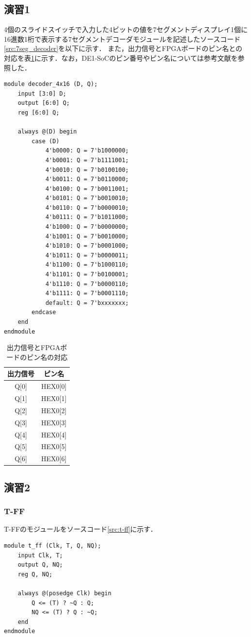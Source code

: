 \documentclass{jlreq}
\numberwithin{equation}{section}
\begin{document}
\subsection{演習1}
4個のスライドスイッチで入力した4ビットの値を7セグメントディスプレイ1個に16進数1桁で表示する7セグメントデコーダモジュールを記述したソースコード\ref{src:7seg_decoder}を以下に示す．
また，出力信号とFPGAボードのピン名との対応を表\ref{tab:decoder-pin}に示す．なお，DE1-SoCのピン番号やピン名については参考文献\cite{user_manual}を参照した．
\begin{lstlisting}[caption=7セグメントデコーダモジュール, label=src:7seg_decoder]
module decoder_4x16 (D, Q);
	input [3:0] D;
	output [6:0] Q;
	reg [6:0] Q;
	
	always @(D) begin
		case (D)
			4'b0000: Q = 7'b1000000;
			4'b0001: Q = 7'b1111001;
			4'b0010: Q = 7'b0100100;
			4'b0011: Q = 7'b0110000;
			4'b0100: Q = 7'b0011001;
			4'b0101: Q = 7'b0010010;
			4'b0110: Q = 7'b0000010;
			4'b0111: Q = 7'b1011000;
			4'b1000: Q = 7'b0000000;
			4'b1001: Q = 7'b0010000;
			4'b1010: Q = 7'b0001000;
			4'b1011: Q = 7'b0000011;
			4'b1100: Q = 7'b1000110;
			4'b1101: Q = 7'b0100001;
			4'b1110: Q = 7'b0000110;
			4'b1111: Q = 7'b0001110;
			default: Q = 7'bxxxxxxx;
		endcase
	end
endmodule
\end{lstlisting}

\begin{table}[H]
	\centering
	\caption{出力信号とFPGAボードのピン名の対応}
	\begin{tabular}{|c|c|}
		\hline
		出力信号 & ピン名  \\ \hline
		Q[0]     & HEX0[0] \\ \hline
		Q[1]     & HEX0[1] \\ \hline
		Q[2]     & HEX0[2] \\ \hline
		Q[3]     & HEX0[3] \\ \hline
		Q[4]     & HEX0[4] \\ \hline
		Q[5]     & HEX0[5] \\ \hline
		Q[6]     & HEX0[6] \\ \hline
	\end{tabular}
	\label{tab:decoder-pin}
\end{table}

\subsection{演習2}
\subsubsection{T-FF}
T-FFのモジュールをソースコード\ref{src:t-ff}に示す．
\begin{lstlisting}[caption=T-FFのモジュール, label=src:t-ff]
module t_ff (Clk, T, Q, NQ);
	input Clk, T;
	output Q, NQ;
	reg Q, NQ;
	
	always @(posedge Clk) begin
		Q <= (T) ? ~Q : Q;
		NQ <= (T) ? Q : ~Q;
	end
endmodule
\end{lstlisting}
\end{document}
